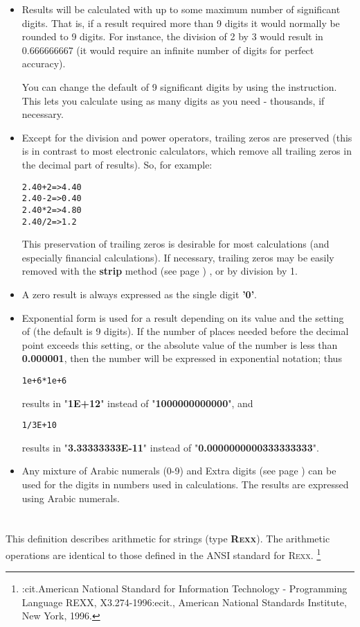 \begin{itemize}
\item Results will be calculated with up to some maximum number of
significant digits.
That is, if a result required more than 9 digits it would normally be
rounded to 9 digits.
For instance, the division of 2 by 3 would result in 0.666666667 (it
would require an infinite number of digits for perfect accuracy).
 
You can change the default of 9 significant digits by using the
 instruction.  This lets you calculate using
as many digits as you need - thousands, if necessary.
\item Except for the division and power operators, trailing zeros are
preserved (this is in contrast to most electronic calculators, which
remove all trailing zeros in the decimal part of results).
So, for example:
\begin{alltt}
2.40 + 2  =>  4.40
2.40 - 2  =>  0.40
2.40 * 2  =>  4.80
2.40 / 2  =>  1.2
\end{alltt}
This preservation of trailing zeros is desirable for most
calculations (and especially financial calculations).
 If necessary, trailing zeros may be easily removed with the
 \textbf{strip} method (see page \pageref{refstrip}) , or by division by 1.
\item A zero result is always expressed as the single
digit \textbf{'0'}.
\item 
Exponential form is used for a result depending on its value and
the setting of  (the default is 9 digits).
If the number of places needed before the decimal point exceeds this
setting, or the absolute value of the number is less
than \textbf{0.000001}, then the number will be expressed in
exponential notation; thus
\begin{alltt}
1e+6 * 1e+6
\end{alltt}
results in "\textbf{1E+12}" instead of
"\textbf{1000000000000}", and
\begin{alltt}
1 / 3E+10
\end{alltt}
results in "\textbf{3.33333333E-11}" instead of
"\textbf{0.0000000000333333333}".
\item 
Any mixture of Arabic numerals (0-9) and  Extra digits (see page \pageref{refsyms}) 
can be used for the digits in numbers used in calculations.  The results
are expressed using Arabic numerals.
\end{itemize}
\section{}\label{}
 This definition describes arithmetic for \nr{} strings
(type \textbf{R\textsc{exx}}).
The arithmetic operations are identical to those defined in the ANSI
standard for R\textsc{exx}.
\footnote{
:cit.American National Standard for Information Technology -
Programming Language REXX, X3.274-1996:ecit., American National
Standards Institute, New York, 1996.
}
